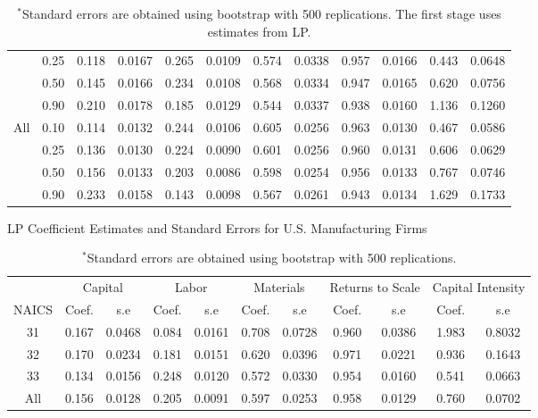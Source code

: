 \documentclass[12pt]{article}
\begin{document}
\begin{appendices}
\begin{table}[H]
\begin{tabular}{cccccccccccc}
   & 0.25 & 0.118 & 0.0167 & 0.265 & 0.0109 & 0.574 & 0.0338 & 0.957 & 0.0166 & 0.443 & 0.0648 \\ 
   & 0.50 & 0.145 & 0.0166 & 0.234 & 0.0108 & 0.568 & 0.0334 & 0.947 & 0.0165 & 0.620 & 0.0756 \\ 
   & 0.90 & 0.210 & 0.0178 & 0.185 & 0.0129 & 0.544 & 0.0337 & 0.938 & 0.0160 & 1.136 & 0.1260 \\ 
  All & 0.10 & 0.114 & 0.0132 & 0.244 & 0.0106 & 0.605 & 0.0256 & 0.963 & 0.0130 & 0.467 & 0.0586 \\ 
   & 0.25 & 0.136 & 0.0130 & 0.224 & 0.0090 & 0.601 & 0.0256 & 0.960 & 0.0131 & 0.606 & 0.0629 \\ 
   & 0.50 & 0.156 & 0.0133 & 0.203 & 0.0086 & 0.598 & 0.0254 & 0.956 & 0.0133 & 0.767 & 0.0746 \\ 
   & 0.90 & 0.233 & 0.0158 & 0.143 & 0.0098 & 0.567 & 0.0261 & 0.943 & 0.0134 & 1.629 & 0.1733 \\ 
   \hline
\end{tabular}
\caption*{\footnotesize $^{*}$Standard errors are obtained using bootstrap with 500 replications. The first stage uses estimates from LP.}
\label{USQLP}
\end{table}

\begin{table}[H]
\centering
\caption{LP Coefficient Estimates and Standard Errors for U.S. Manufacturing Firms}
\small
\begin{tabular}{ccccccccccc}
  \hline\hline & \multicolumn{2}{c}{Capital} & \multicolumn{2}{c}{Labor} & \multicolumn{2}{c}{Materials} & \multicolumn{2}{c}{Returns to Scale} & \multicolumn{2}{c}{Capital Intensity}\\ \cmidrule(lr){2-3} \cmidrule(lr){4-5} \cmidrule(lr){6-7} \cmidrule(lr){8-9} \cmidrule(lr){10-11}NAICS & Coef. & s.e & Coef. & s.e & Coef. & s.e & Coef. & s.e & Coef. & s.e \\ 
  \hline
31 & 0.167 & 0.0468 & 0.084 & 0.0161 & 0.708 & 0.0728 & 0.960 & 0.0386 & 1.983 & 0.8032 \\ 
  32 & 0.170 & 0.0234 & 0.181 & 0.0151 & 0.620 & 0.0396 & 0.971 & 0.0221 & 0.936 & 0.1643 \\ 
  33 & 0.134 & 0.0156 & 0.248 & 0.0120 & 0.572 & 0.0330 & 0.954 & 0.0160 & 0.541 & 0.0663 \\ 
  All & 0.156 & 0.0128 & 0.205 & 0.0091 & 0.597 & 0.0253 & 0.958 & 0.0129 & 0.760 & 0.0702 \\ 
   \hline
\end{tabular}
\caption*{\footnotesize $^{*}$Standard errors are obtained using bootstrap with 500 replications.}
\label{USLP}
\end{table}


\end{appendices}
\end{document}

